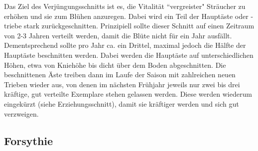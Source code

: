 \documentclass[]{article}
\begin{document}
Das Ziel des Verjüngungsschnitts ist es, die Vitalität ``vergreister" Sträucher zu erhöhen und sie zum Blühen anzuregen. 
Dabei wird ein Teil der Hauptäste oder -triebe stark zurückgeschnitten.
Prinzipiell sollte dieser Schnitt auf einen Zeitraum von 2-3 Jahren verteilt werden, damit die Blüte nicht für ein Jahr ausfällt.
Dementsprechend sollte pro Jahr ca. ein Drittel, maximal jedoch die Hälfte der Hauptäste beschnitten werden.
Dabei werden die Hauptäste auf unterschiedlichen Höhen, etwa von Kniehöhe bis dicht über dem Boden abgeschnitten.
Die beschnittenen Äste treiben dann im Laufe der Saison mit zahlreichen neuen Trieben wieder aus, von denen im nächsten Frühjahr jeweils nur zwei bis drei kräftige, gut verteilte Exemplare stehen gelassen werden.
Diese werden wiederum eingekürzt (siehe Erziehungsschnitt), damit sie kräftiger werden und sich gut verzweigen. 

\subsection{Forsythie}


\pagebreak



\end{document}
